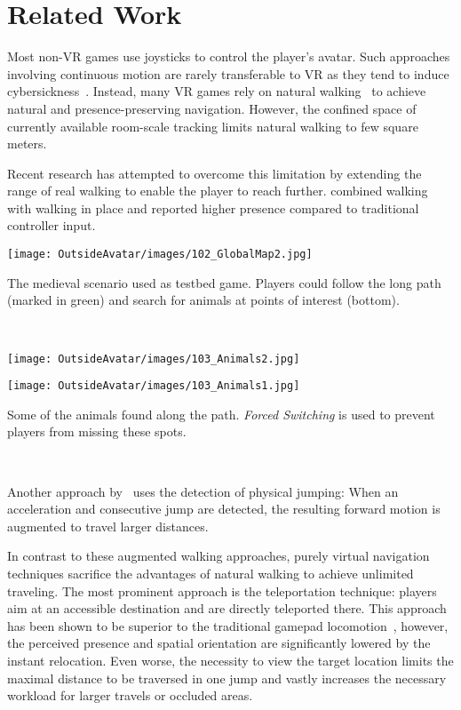 \documentclass[sigchi-a, authorversion]{acmart}
\newcommand{\comm}[1]{}
\begin{document}
\section{Related Work}
Most non-VR games use joysticks\comm{ or keyboards} to control\comm{ the movement of} the player's avatar. Such approaches involving continuous\comm{ virtual} motion are rarely transferable to VR as they tend to induce cybersickness~\cite{Habgood:2017:HLP:3130859.3131437}. Instead, many VR games rely on natural walking~\cite{ruddle2009benefits} to achieve natural and presence-preserving navigation. However, the confined \comm{supported }space of currently available room-scale tracking limits natural walking to few square meters. \par
Recent research has attempted to overcome this limitation by extending the range of real walking to enable the player to reach further. \citet{ Bhandari:2017:LSW:3139131.3139133} combined walking with walking in place and reported higher presence compared to traditional controller input.
\begin{marginfigure}
     \texttt{[image: OutsideAvatar/images/102\_GlobalMap2.jpg]}
     \caption{The medieval scenario used as testbed game. Players could follow the long path (marked in green) and search for animals at points of interest (bottom).}~\label{fig:world}
\end{marginfigure}
\begin{marginfigure}
     \texttt{[image: OutsideAvatar/images/103\_Animals2.jpg]}
     \vspace{-0.5em}
     
     \texttt{[image: OutsideAvatar/images/103\_Animals1.jpg]}
     \caption{Some of the animals found along the path. \textit{Forced Switching} is used to prevent players from missing these spots.}~\label{fig:animals}
\end{marginfigure}
Another approach by~\citet{bolte2011jumper} uses the detection of physical jumping: When an acceleration and consecutive jump are detected, the resulting forward motion is augmented to travel larger distances. \comm{Similarly,~\citet{ interrante2007seven} proposed their Seven League Boots metaphor that deduces and augments the intended travel direction while leaving all other directions unchanged.}\par
In contrast to these augmented walking approaches, purely virtual navigation techniques sacrifice the advantages of natural walking to achieve unlimited traveling. The most prominent approach is the teleportation technique: players aim at an accessible destination and are directly teleported there. This approach has been shown to be superior to the traditional gamepad locomotion~\cite{frommel2017effects}, however, the perceived presence and spatial orientation are significantly lowered by the instant relocation. Even worse, the necessity to view the target location limits the maximal distance to be traversed in one jump and vastly increases the necessary workload for larger travels or occluded areas. \par
\end{document}
